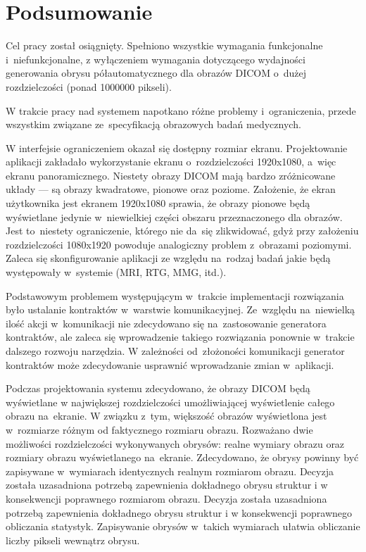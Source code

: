 \documentclass[a4paper,11pt,twoside,openright]{report}
\newcommand\blankpage{%
    \null
    \thispagestyle{empty}%
    \newpage}
\theoremstyle{definition}
\begin{document}
\chapter {Podsumowanie}


Cel pracy został osiągnięty. Spełniono wszystkie wymagania funkcjonalne i~niefunkcjonalne,
z wyłączeniem wymagania dotyczącego wydajności generowania obrysu półautomatycznego
dla obrazów DICOM o~dużej rozdzielczości (ponad 1000000 pikseli).

W trakcie pracy nad systemem napotkano różne problemy i~ograniczenia, przede wszystkim
związane ze~specyfikacją obrazowych badań medycznych.

W interfejsie ograniczeniem okazał się dostępny rozmiar ekranu. Projektowanie
aplikacji zakładało wykorzystanie ekranu o~rozdzielczości 1920x1080, a~więc ekranu
panoramicznego. Niestety obrazy DICOM mają bardzo zróżnicowane układy --- są obrazy
kwadratowe, pionowe oraz poziome. Założenie, że ekran użytkownika jest ekranem
1920x1080 sprawia, że obrazy pionowe będą wyświetlane jedynie w~niewielkiej
części obszaru przeznaczonego dla obrazów. Jest to~niestety ograniczenie, którego
nie da~się zlikwidować, gdyż przy założeniu rozdzielczości 1080x1920 powoduje
analogiczny problem z~obrazami poziomymi. Zaleca się skonfigurowanie aplikacji
ze względu na~rodzaj badań jakie będą występowały w~systemie (MRI, RTG, MMG, itd.).


Podstawowym problemem występującym w~trakcie implementacji rozwiązania było
ustalanie kontraktów w~warstwie komunikacyjnej. Ze~względu na~niewielką ilość
akcji w~komunikacji nie zdecydowano się na~zastosowanie generatora kontraktów,
ale zaleca się wprowadzenie takiego rozwiązania ponownie w~trakcie dalszego rozwoju narzędzia.
W zależności od~złożoności komunikacji generator kontraktów może zdecydowanie
usprawnić wprowadzanie zmian w~aplikacji.

Podczas projektowania systemu zdecydowano, że obrazy DICOM będą wyświetlane w
największej rozdzielczości umożliwiającej wyświetlenie całego obrazu na~ekranie.
W związku z~tym, większość obrazów wyświetlona jest w~rozmiarze różnym od
faktycznego rozmiaru obrazu. Rozważano dwie możliwości rozdzielczości wykonywanych
obrysów: realne wymiary obrazu oraz rozmiary obrazu wyświetlanego na~ekranie.
Zdecydowano, że obrysy powinny być zapisywane w~wymiarach identycznych realnym
rozmiarom obrazu. Decyzja została uzasadniona potrzebą zapewnienia dokładnego obrysu struktur i w konsekwencji poprawnego
rozmiarom obrazu. Decyzja została uzasadniona potrzebą zapewnienia dokładnego obrysu struktur i w konsekwencji poprawnego
obliczania statystyk. Zapisywanie obrysów w~takich wymiarach ułatwia obliczanie
liczby pikseli wewnątrz obrysu.
\end{document}
